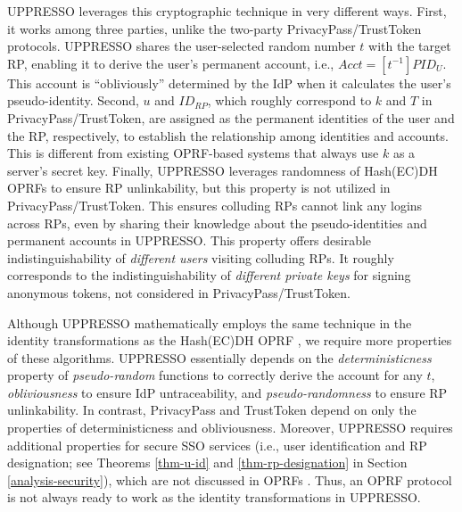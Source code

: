 UPPRESSO leverages this cryptographic technique in very different ways.
First, 
it works among three parties, unlike the two-party PrivacyPass/TrustToken protocols.
UPPRESSO shares the user-selected random number $t$ with the target RP,
enabling it to derive the user's permanent account, i.e., $Acct = [t^{-1}]PID_{U}$. This account is ``obliviously'' determined by the IdP when it calculates the user's pseudo-identity.
Second, $u$ and $ID_{RP}$, which roughly correspond to $k$ and $T$ in PrivacyPass/TrustToken, are assigned as the permanent identities of the user and the RP, respectively, to establish the relationship among identities and accounts.
This is different from existing OPRF-based systems  \cite{privacypass, trusttoken, strong-oprf, oprf-bitcoin-wallet, pesto, oprf-ot-si, pp-ss, Private-Contact-Discovery, o-kms, oprf-deduplication} that always use $k$ as a server's secret key.
Finally, UPPRESSO leverages randomness of Hash(EC)DH OPRFs to ensure RP unlinkability, but this property is not utilized in PrivacyPass/TrustToken.
This ensures colluding RPs cannot link any logins across RPs,
even by sharing their knowledge about the pseudo-identities and permanent accounts in UPPRESSO.
This property offers desirable indistinguishability of \emph{different users} visiting colluding RPs.
It roughly corresponds to the indistinguishability of \emph{different private keys} for signing anonymous tokens, not considered in PrivacyPass/TrustToken. 

Although UPPRESSO mathematically employs the same technique in the identity transformations as the Hash(EC)DH OPRF \cite{oprf-proved,voprf-proved}, we require more properties of these algorithms. %
UPPRESSO essentially 
depends on the \emph{deterministicness} property of \emph{pseudo-random} functions to correctly derive the account for any $t$, \emph{obliviousness} to ensure IdP untraceability, 
and \emph{pseudo-randomness} to ensure RP unlinkability. 
In contrast, PrivacyPass and TrustToken \cite{privacypass,trusttoken} depend on only the properties of deterministicness and obliviousness.
Moreover, UPPRESSO requires additional properties for secure SSO services (i.e., user identification and RP designation; see Theorems \ref{thm-u-id} and \ref{thm-rp-designation} in Section \ref{analysis-security}),
    which are not discussed in OPRFs \cite{sok-oprf,oprf-proved,voprf-proved}.
Thus, an OPRF protocol is not always ready to work as the identity transformations in UPPRESSO.

